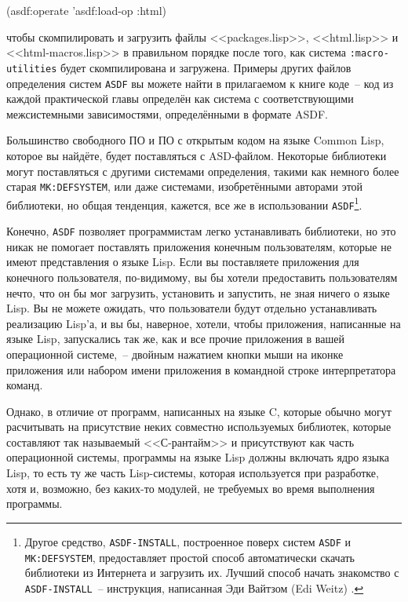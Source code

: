 \begin{myverb}
(asdf:operate 'asdf:load-op :html)
\end{myverb}

\noindent{}чтобы скомпилировать и загрузить файлы <<packages.lisp>>, <<html.lisp>> и
<<html-macros.lisp>> в правильном порядке после того, как система \lstinline{:macro-utilities}
будет скомпилирована и загружена. Примеры других файлов определения систем \lstinline{ASDF} вы
можете найти в прилагаемом к книге коде~-- код из каждой практической главы определён как
система с соответствующими межсистемными зависимостями, определёнными в формате ASDF.

Большинство свободного ПО и ПО с открытым кодом на языке Common Lisp, которое вы найдёте,
будет поставляться с ASD-файлом. Некоторые библиотеки могут поставляться с другими
системами определения, такими как немного более старая \lstinline{MK:DEFSYSTEM}, или даже
системами, изобретёнными авторами этой библиотеки, но общая тенденция, кажется, все же в
использовании \lstinline{ASDF}\footnote{Другое средство, \lstinline{ASDF-INSTALL},
  построенное поверх систем \lstinline{ASDF} и \lstinline{MK:DEFSYSTEM}, предоставляет
  простой способ автоматически скачать библиотеки из Интернета и загрузить их. Лучший
  способ начать знакомство с \lstinline{ASDF-INSTALL}~-- инструкция, написанная Эди
  Вайтзом (Edi Weitz) . }.

Конечно, \lstinline{ASDF} позволяет программистам легко устанавливать библиотеки, но это никак
не помогает поставлять приложения конечным пользователям, которые не имеют представления о
языке Lisp. Если вы поставляете приложения для конечного пользователя, по-видимому, вы бы
хотели предоставить пользователям нечто, что он бы мог загрузить, установить и запустить,
не зная ничего о языке Lisp. Вы не можете ожидать, что пользователи будут отдельно
устанавливать реализацию Lisp'а, и вы бы, наверное, хотели, чтобы приложения, написанные на
языке Lisp, запускались так же, как и все прочие приложения в вашей операционной
системе,~-- двойным нажатием кнопки мыши на иконке приложения или набором имени приложения
в командной строке интерпретатора команд.

Однако, в отличие от программ, написанных на языке C, которые обычно могут расчитывать на
присутствие неких совместно используемых библиотек, которые составляют так называемый
<<С-рантайм>> и присутствуют как часть операционной системы, программы на языке Lisp
должны включать ядро языка Lisp, то есть ту же часть Lisp-системы, которая используется
при разработке, хотя и, возможно, без каких-то модулей, не требуемых во время выполнения
программы.

